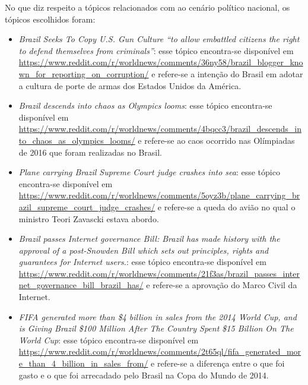 No que diz respeito a tópicos relacionados com ao cenário político nacional, os
tópicos escolhidos foram:
\sloppy
\begin{itemize}
  \item
  \textit{Brazil Seeks To Copy U.S. Gun Culture ``to allow embattled
  citizens the right to defend themselves from
  criminals''}: esse tópico encontra-se disponível em 
  \url{https://www.reddit.com/r/worldnews/comments/36ny58/brazil_blogger_known_for_reporting_on_corruption/}
  e refere-se a intenção do Brasil em adotar a cultura de porte de armas dos
  Estados Unidos da América.
  \item
  \textit{Brazil descends into chaos as Olympics looms}: esse tópico encontra-se disponível em 
  \url{https://www.reddit.com/r/worldnews/comments/4bqcc3/brazil_descends_into_chaos_as_olympics_looms/}
  e refere-se ao caos ocorrido nas Olímpiadas de 2016 que foram realizadas no
  Brasil.
  \item
  \textit{Plane carrying Brazil Supreme Court judge crashes into sea}: esse tópico encontra-se disponível em
  \url{https://www.reddit.com/r/worldnews/comments/5oyz3b/plane_carrying_brazil_supreme_court_judge_crashes/}
  e refere-se a queda do avião no qual o ministro Teori Zavascki estava abordo.
  \item
  \textit{Brazil passes Internet governance Bill: Brazil has made history with
  the approval of a post-Snowden Bill which sets out principles, rights and
  guarantees for Internet users.}: esse tópico encontra-se disponível em
  \url{https://www.reddit.com/r/worldnews/comments/21f3as/brazil_passes_internet_governance_bill_brazil_has/}
  e refere-se a aprovação do Marco Civil da Internet.
  \item
  \textit{FIFA generated more than \$4 billion in sales from the 2014 World Cup,
  and is Giving Brazil \$100 Million After The Country Spent \$15 Billion On The
  World Cup}: esse tópico encontra-se disponível em
  \url{https://www.reddit.com/r/worldnews/comments/2t65ql/fifa_generated_more_than_4_billion_in_sales_from/}
  e refere-se a diferença entre o que foi gasto e o que foi arrecadado pelo
  Brasil na Copa do Mundo de 2014.
 
\end{itemize}

